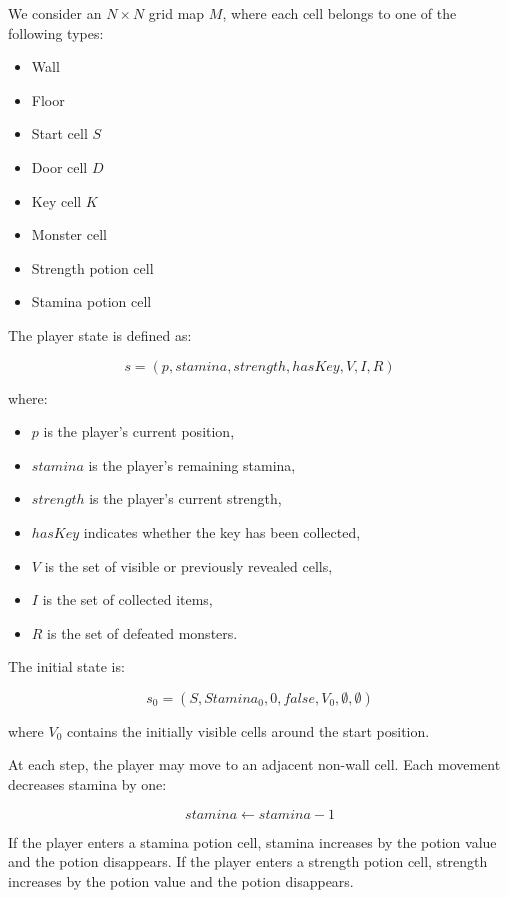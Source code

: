\documentclass[11pt]{article}
\begin{document}
We consider an $N \times N$ grid map $M$, where each cell belongs to one of the following types:

\begin{itemize}[noitemsep]
    \item Wall
    \item Floor
    \item Start cell $S$
    \item Door cell $D$
    \item Key cell $K$
    \item Monster cell
    \item Strength potion cell
    \item Stamina potion cell
\end{itemize}

The player state is defined as:

\[
s = (p, stamina, strength, hasKey, V, I, R)
\]

where:

\begin{itemize}[noitemsep]
    \item $p$ is the player's current position,
    \item $stamina$ is the player's remaining stamina,
    \item $strength$ is the player's current strength,
    \item $hasKey$ indicates whether the key has been collected,
    \item $V$ is the set of visible or previously revealed cells,
    \item $I$ is the set of collected items,
    \item $R$ is the set of defeated monsters.
\end{itemize}

The initial state is:

\[
s_0 = (S, Stamina_0, 0, false, V_0, \emptyset, \emptyset)
\]

where $V_0$ contains the initially visible cells around the start position.

At each step, the player may move to an adjacent non-wall cell. Each movement decreases stamina by one:

\[
stamina \leftarrow stamina - 1
\]

If the player enters a stamina potion cell, stamina increases by the potion value and the potion disappears. If the player enters a strength potion cell, strength increases by the potion value and the potion disappears.
\end{document}
